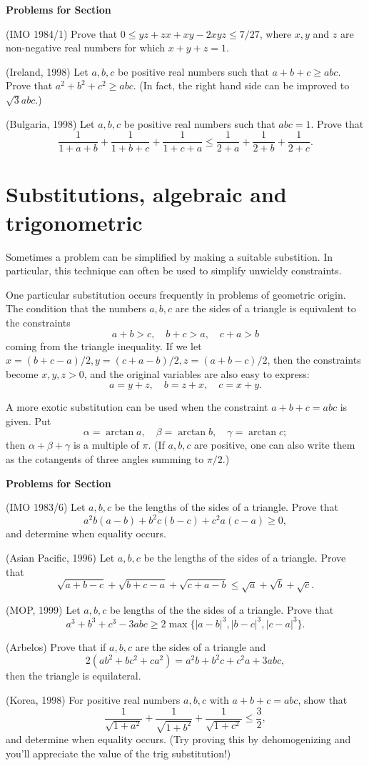 \documentclass[12pt]{report}
\def\ii{\item}
\newcounter{exc}
\numberwithin{exc}{section}
\newenvironment{exer}{\vspace{0.1in}
\noindent \textbf{Problems for Section~\thesection} \vspace{0.1in}
\begin{list}{\arabic{exc}.}{\usecounter{exc}}}{\end{list}}
\begin{document}
\begin{exer}
\ii (IMO 1984/1) Prove that $0\leq yz+zx+xy-2xyz\leq 7/27$, where $x,y$
and $z$ are non-negative real numbers for which $x+y+z=1$.
\ii (Ireland, 1998)
Let $a,b,c$ be positive real numbers such that $a+b+c \geq abc$. 
Prove that $a^2+b^2+c^2 \geq abc$. (In fact, the right hand side can
be improved to $\sqrt{3}abc$.)
\ii (Bulgaria, 1998)
Let $a,b,c$ be positive real numbers such that $abc=1$. Prove that
\[
\frac{1}{1+a+b} + \frac{1}{1+b+c} + \frac{1}{1+c+a}
\leq \frac{1}{2+a} + \frac{1}{2+b} + \frac{1}{2+c}.
\]
\end{exer}

\section{Substitutions, algebraic and trigonometric}
Sometimes a problem can be simplified by making a suitable 
substition. In particular, this technique can often be used to 
simplify unwieldy constraints.

One particular substitution occurs frequently in problems of 
geometric origin. The condition that the numbers $a,b,c$ are the 
sides of a triangle is equivalent to the constraints
\[
a+b > c, \quad b+c >a, \quad c+a >b
\]
coming from the triangle inequality. If we let $x = (b+c-a)/2, y = 
(c+a-b)/2, z= (a+b-c)/2$, then the constraints become $x,y,z > 0$, and 
the original variables are also easy to express:
\[
a = y+z, \quad b = z+x, \quad c = x+y.
\]

A more exotic substitution can be used when the constraint 
$a+b+c=abc$ is given. Put
\[
\alpha = \arctan a, \quad \beta = \arctan b, \quad \gamma = \arctan c;
\]
then $\alpha + \beta + \gamma$ is a multiple of $\pi$. (If $a,b,c$ are 
positive, one can also write them as the cotangents of three angles 
summing to $\pi/2$.)

\begin{exer}
\ii (IMO 1983/6)  Let $a,b,c$ be the lengths of the sides of a triangle. 
Prove that
\[a^2b(a-b)+b^2 c(b-c) + c^2a(c-a) \geq 0,\] and determine when equality
occurs.
\ii (Asian Pacific, 1996)
Let $a,b,c$ be the lengths of the sides of a triangle. Prove that
\[
\sqrt{a+b-c} + \sqrt{b+c-a} + \sqrt{c+a-b}
\leq \sqrt{a} + \sqrt{b} + \sqrt{c}.
\]
\ii (MOP, 1999)
Let $a,b,c$ be lengths of the the sides of a triangle. Prove that
\[
a^3 + b^3 + c^3 - 3abc \geq 2 \max \{|a-b|^3, |b-c|^3, |c-a|^3\}.
\]
\ii (Arbelos)
Prove that if $a,b,c$ are the sides of a triangle and
\[
2(ab^{2}+bc^{2}+ca^{2}) = a^{2}b+b^{2}c+c^{2}a + 3abc,
\]
then the triangle is equilateral.
\ii (Korea, 1998)
For positive real numbers $a,b,c$ with $a+b+c=abc$, show that
\[
\frac{1}{\sqrt{1+a^{2}}} + \frac{1}{\sqrt{1+b^{2}}} + 
\frac{1}{\sqrt{1+c^{2}}} \leq \frac{3}{2},
\]
and determine when equality occurs. (Try proving this by 
dehomogenizing and you'll appreciate the value of the trig 
substitution!)
\end{exer}
\end{document}
